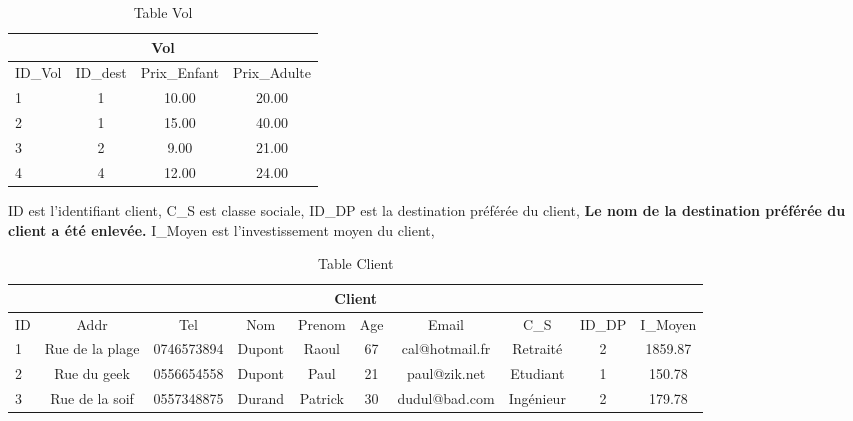 \begin{table}[h]
\begin{center}
\begin{tabular}{|l|c|c|c|}
\hline
\multicolumn{4}{|c|}{Vol}\\
\hline
ID\_Vol& ID\_dest & Prix\_Enfant& Prix\_Adulte\\
\hline
1 & 1& 10.00 & 20.00\\
\hline
2 & 1& 15.00& 40.00\\
\hline
3 & 2& 9.00& 21.00\\
\hline
4 & 4& 12.00& 24.00\\
\hline
\end{tabular}
\end{center}
\caption{Table Vol}
\end{table}


\begin{table}[h]
ID est l'identifiant client,
C\_S est classe sociale,
ID\_DP est la destination pr\'ef\'er\'ee du client,
\textbf{Le nom de la destination pr\'ef\'er\'ee du client a \'et\'e enlev\'ee.}
I\_Moyen est l'investissement moyen du client,
\bigskip

\begin{tabular}{|l|c|c|c|c|c|c|c|c|c|}
\hline
\multicolumn{10}{|c|}{Client}\\
\hline
ID& Addr& Tel & Nom & Prenom & Age & Email&C\_S & ID\_DP &I\_Moyen\\
\hline
1 &Rue de la plage&0746573894&Dupont&Raoul&67 &cal@hotmail.fr&Retrait\'e&2&1859.87\\
\hline
2 &Rue du geek&0556654558&Dupont&Paul&21 &paul@zik.net&Etudiant&1&150.78\\
\hline
3 &Rue de la soif&0557348875&Durand&Patrick&30 &dudul@bad.com&Ing\'enieur&2&179.78\\
\hline
\end{tabular}
\caption{Table Client}
\end{table}


